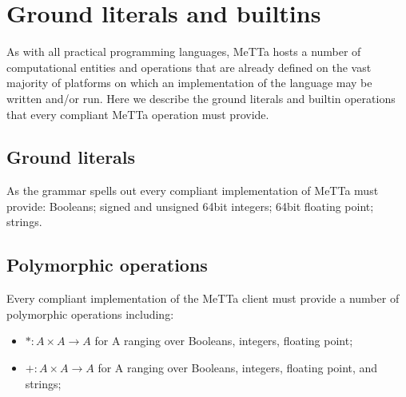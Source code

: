 \section{Ground literals and builtins}
As with all practical programming languages, MeTTa hosts a number of computational entities and operations that are already defined on the vast majority of platforms on which an implementation of the language may be written and/or run. Here we describe the ground literals and builtin operations that every compliant MeTTa operation must provide.
\subsection{Ground literals}
As the grammar spells out every compliant implementation of MeTTa must provide: Booleans; signed and unsigned 64bit integers; 64bit floating point; strings.

\subsection{Polymorphic operations}
Every compliant implementation of the MeTTa client must provide a number of polymorphic operations including:

\begin{itemize}
  \item $* : A \times A \rightarrow A$ for A ranging over Booleans, integers, floating point;
  \item $+ : A \times A \rightarrow A$ for A ranging over Booleans, integers, floating point, and strings;
\end{itemize}

